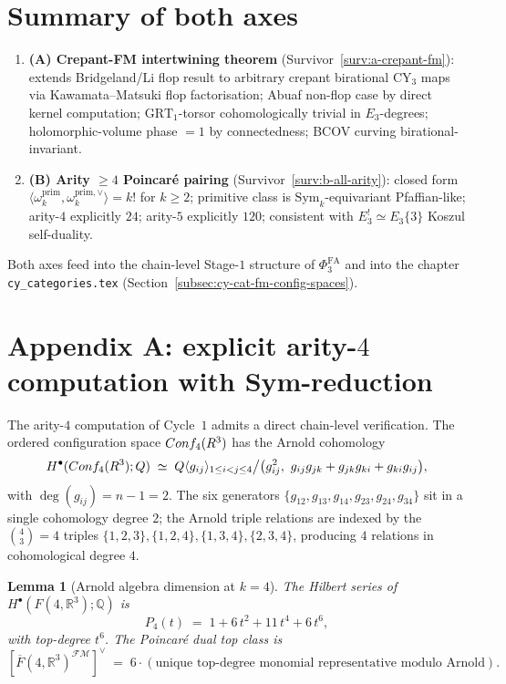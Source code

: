 \documentclass[11pt]{article}
\newtheorem{lemma}[theorem]{Lemma}
\theoremstyle{definition}
\theoremstyle{remark}
\providecommand{\FMbar}{\overline{F}}
\providecommand{\FM}{\mathcal{FM}}
\providecommand{\PhiFA}{\Phi^{\mathrm{FA}}}
\providecommand{\FM}{\mathrm{FM}}
\providecommand{\RR}{\mathbb{R}}
\providecommand{\QQ}{\mathbb{Q}}
\providecommand{\GRT}{\mathrm{GRT}}
\providecommand{\Sym}{\mathrm{Sym}}
\begin{document}
\section{Summary of both axes}

\begin{enumerate}
\item \textbf{(A) Crepant-FM intertwining theorem}
 (Survivor~\ref{surv:a-crepant-fm}): extends Bridgeland/Li flop
 result to arbitrary crepant birational CY$_3$ maps via
 Kawamata--Matsuki flop factorisation; Abuaf non-flop case by
 direct kernel computation; $\GRT_1$-torsor cohomologically
 trivial in $E_3$-degrees; holomorphic-volume phase $=1$ by
 connectedness; BCOV curving birational-invariant.
\item \textbf{(B) Arity $\geq 4$ Poincar\'e pairing} (Survivor~\ref{surv:b-all-arity}):
 closed form $\langle \omega_k^{\mathrm{prim}}, \omega_k^{\mathrm{prim},\vee}
 \rangle = k!$ for $k \geq 2$; primitive class is
 $\Sym_k$-equivariant Pfaffian-like; arity-$4$ explicitly $24$;
 arity-$5$ explicitly $120$; consistent with $E_3^! \simeq E_3\{3\}$
 Koszul self-duality.
\end{enumerate}

Both axes feed into the chain-level Stage-$1$ structure of
$\PhiFA_3$ and into the chapter \texttt{cy\_categories.tex}
(Section~\ref{subsec:cy-cat-fm-config-spaces}).

\section{Appendix A: explicit arity-$4$ computation with Sym-reduction}

The arity-$4$ computation of Cycle~$1$ admits a direct chain-level
verification. The ordered configuration space $\Conf_4(\RR^3)$ has the
Arnold cohomology
\[
 H^\bullet(\Conf_4(\RR^3); \QQ)
 \;\simeq\;
 \QQ\langle g_{ij} \rangle_{1 \le i < j \le 4} \big/
  \bigl(g_{ij}^2,\ g_{ij}g_{jk} + g_{jk}g_{ki} + g_{ki}g_{ij}\bigr),
\]
with $\deg(g_{ij}) = n - 1 = 2$. The six generators
$\{g_{12}, g_{13}, g_{14}, g_{23}, g_{24}, g_{34}\}$ sit in a
single cohomology degree $2$; the Arnold triple relations are
indexed by the $\binom{4}{3} = 4$ triples
$\{1,2,3\}, \{1,2,4\}, \{1,3,4\}, \{2,3,4\}$, producing $4$ relations
in cohomological degree $4$.

\begin{lemma}[Arnold algebra dimension at $k = 4$]
\label{lem:arnold-dim-k4}
The Hilbert series of $H^\bullet(F(4, \RR^3); \QQ)$ is
\[
 P_4(t) \;=\; 1 + 6\, t^2 + 11\, t^4 + 6\, t^6,
\]
with top-degree $t^6$. The Poincar\'e dual top class is
\[
 [\FMbar(4, \RR^3)^{\FM}]^{\vee} \;=\; 6 \cdot (\text{unique
 top-degree monomial representative modulo Arnold}).
\]
\end{lemma}
\end{document}
